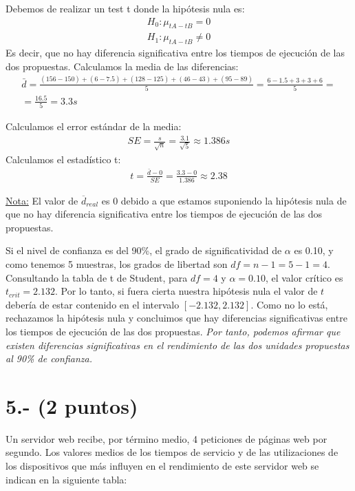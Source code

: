 \documentclass[a4paper,12pt]{article}
\begin{document}
Debemos de realizar un test t donde la hipótesis nula es:
\begin{align*}
    H_0: \mu_{tA - tB} = 0\\
    H_1: \mu_{tA - tB} \neq 0
\end{align*}
Es decir, que no hay diferencia significativa entre los tiempos de ejecución de las dos propuestas.
Calculamos la media de las diferencias:
\begin{align*}
    \bar{d} = \frac{(156-150) + (6-7.5) + (128-125) + (46-43) + (95-89)}{5} = \frac{6 - 1.5 + 3 + 3 + 6}{5}  =\\
    = \frac{16.5}{5} = 3.3s
\end{align*}

Calculamos el error estándar de la media:
\begin{align*}
    SE = \frac{s}{\sqrt{n}} = \frac{3.1}{\sqrt{5}} \approx 1.386s
\end{align*}
Calculamos el estadístico t:
\begin{align*}
    t = \frac{\bar{d} - 0}{SE} = \frac{3.3 - 0}{1.386} \approx 2.38
\end{align*}

\underline{Nota:} El valor de $\overline{d}_{real}$ es 0 debido a que estamos suponiendo la hipótesis nula de que no hay diferencia significativa entre los tiempos de ejecución de las dos propuestas.

Si el nivel de confianza es del 90\%, el grado de significatividad de $\alpha$ es 0.10, y como tenemos 5 muestras, los grados de libertad son $df = n - 1 = 5 - 1 = 4$. Consultando la tabla de t de Student, para $df = 4$ y $\alpha = 0.10$, el valor crítico es $t_{crit} = 2.132$. Por lo tanto, si fuera cierta nuestra hipótesis nula el valor de $t$ debería de estar contenido en el  intervalo $[-2.132, 2.132]$. Como no lo  está, rechazamos la hipótesis nula y concluimos que hay diferencias significativas entre los tiempos de ejecución de las dos propuestas. \textit{Por tanto, podemos afirmar que existen diferencias significativas en el rendimiento de las dos unidades propuestas al  90\% de confianza.}


\section*{5.- (2 puntos)}
Un servidor web recibe, por término medio, 4 peticiones de páginas web por segundo. Los valores medios de los tiempos de servicio y de las utilizaciones de los dispositivos que más influyen en el rendimiento de este servidor web se indican en la siguiente tabla:
\end{document}
